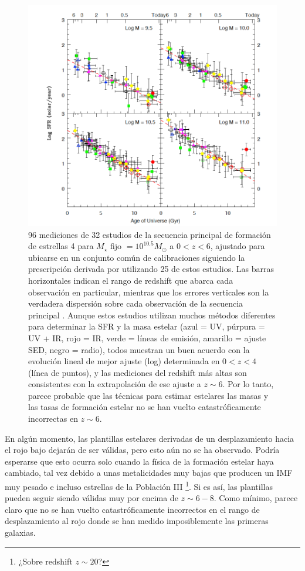 \documentclass{article}
\begin{document}
\begin{figure}[t]
\begin{center}
\includegraphics[scale=0.65]{Figuras/steindhart_fig2}
\caption{\label{fig:steindhart_fig2} 96 mediciones de 32 estudios de la secuencia principal de formación de estrellas 4 para $M_\star$ fijo $= 10^{10.5}M_\odot$ a $0 <z <6$, ajustado para ubicarse en un conjunto común de calibraciones siguiendo la prescripción derivada por \cite{speagle2014highly} utilizando 25 de estos estudios. Las barras horizontales indican el rango de redshift que abarca cada observación en particular, mientras que los errores verticales son la verdadera dispersión sobre cada observación de la secuencia principal \citep{speagle2014highly}. Aunque estos estudios utilizan muchos métodos diferentes para determinar la SFR y la masa estelar (azul = UV, púrpura = UV + IR, rojo = IR, verde = líneas de emisión, amarillo = ajuste SED, negro = radio), todos muestran un buen acuerdo con  la evolución lineal de mejor ajuste (log) determinada en $0 <z <4$ (línea de puntos), y las mediciones del redshift más altas son consistentes con la extrapolación de ese ajuste a $z\sim 6$. Por lo tanto, parece probable que las técnicas para estimar estelares las masas y las tasas de formación estelar no se han vuelto catastróficamente incorrectas en $z\sim 6$.}
\end{center}
\end{figure}

En algún momento, las plantillas estelares derivadas de un desplazamiento hacia el rojo bajo dejarán de ser válidas, pero esto aún no se ha observado. Podría esperarse que esto ocurra solo cuando la física de la formación estelar haya cambiado, tal vez debido a unas metalicidades muy bajas que producen un IMF muy pesado e incluso estrellas de la Población III \footnote{¿Sobre redshift $z\sim 20$?}. Si es así, las plantillas pueden seguir siendo válidas muy por encima de $z\sim 6-8$. Como mínimo, parece claro que no se han vuelto catastróficamente incorrectos en el rango de desplazamiento al rojo donde se han medido imposiblemente las primeras galaxias.\\
\end{document}
